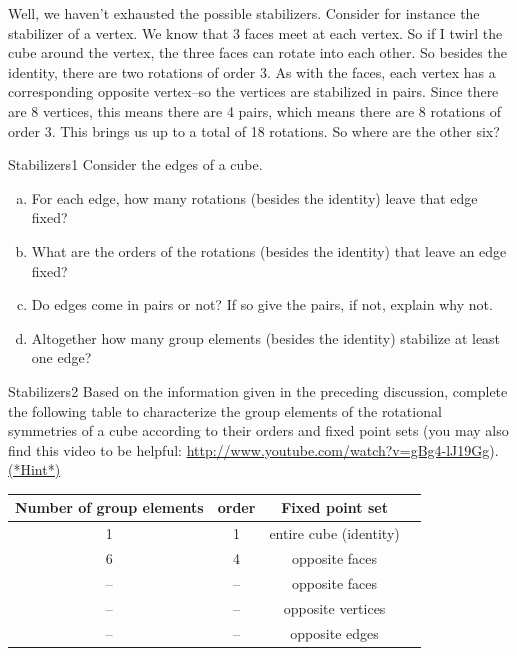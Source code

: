 Well, we haven't exhausted the possible stabilizers. Consider for instance the stabilizer of a vertex. We know that 3 faces meet at each vertex. So if I twirl the cube around the vertex, the three faces can rotate into each other. So besides the identity, there are two rotations of order 3. As with the faces, each vertex has a corresponding opposite vertex--so the vertices are stabilized in pairs. Since there are 8 vertices, this means there are 4 pairs, which means there are 8 rotations of order 3. This brings us up to a total of 18 rotations. So where are the other six?

\begin{exercise}{Stabilizers1}
Consider the edges of a cube.
\begin{enumerate}[(a)]
\item
For each edge, how many rotations (besides the identity) leave that edge fixed?
\item
What are the orders of the rotations (besides the identity) that leave an edge fixed?
\item
Do edges come in pairs or not?  If so give the pairs, if not, explain why not.
\item
Altogether how many group elements (besides the identity) stabilize at least one edge?
\end{enumerate}
\end{exercise}
\begin{exercise}{Stabilizers2}
Based on the information given in the preceding discussion, complete the following table to characterize the group elements of the rotational symmetries of a cube according to their orders and fixed point sets (you may also find this video to be helpful: \url{http://www.youtube.com/watch?v=gBg4-lJ19Gg}).
\hyperref[sec:actions:hints]{(*Hint*)}

\begin{tabular}{| c |c|c| r |}\hline
 \textbf{ Number of group elements} & \textbf{order} & \textbf{Fixed point set} \\ \hline
  1 & 1 & entire cube (identity) \\ \hline
  6 & 4 & opposite faces \\ \hline
 -- & -- & opposite faces \\ \hline
-- & -- & opposite vertices \\ \hline
-- & -- & opposite edges \\ \hline
\end{tabular}
\end{exercise}
